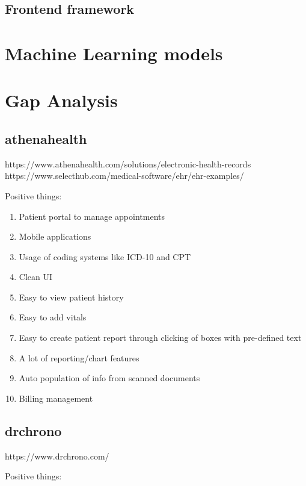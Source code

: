\subsection{Frontend framework}



\section{Machine Learning models}

\section{Gap Analysis}

\subsection{athenahealth}

https://www.athenahealth.com/solutions/electronic-health-records
https://www.selecthub.com/medical-software/ehr/ehr-examples/

Positive things:

\begin{enumerate}
    \item Patient portal to manage appointments
    \item Mobile applications
    \item Usage of coding systems like ICD-10 and CPT
    \item Clean UI
    \item Easy to view patient history
    \item Easy to add vitals
    \item Easy to create patient report through clicking of boxes with  pre-defined text
    \item A lot of reporting/chart features
    \item Auto population of info from scanned documents
    \item Billing management
\end{enumerate}

\subsection{drchrono}

https://www.drchrono.com/

Positive things:

